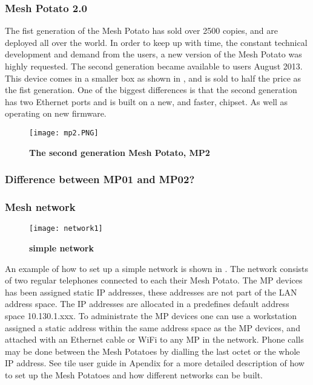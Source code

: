 \subsubsection{Mesh Potato 2.0}
The fist generation of the Mesh Potato has sold over 2500 copies, and are deployed all over the world. In order to keep up with time, the constant technical development and demand from the users, a new version of the Mesh Potato was highly requested. The second generation became available to users August 2013. This device comes in a smaller box as shown in , and is sold to half the price as the fist generation. One of the biggest differences is that the second generation has two Ethernet ports and is built on a new, and faster, chipset. As well as operating on new firmware.

\begin{figure}[h!]
  \centering
      \texttt{[image: mp2.PNG]}
  \caption [MP2]{\textbf{The second generation Mesh Potato, MP2}}
  \label{fig:MP02}
\end{figure}

\subsubsection{Difference between MP01 and MP02?}



\subsubsection{Mesh network}
\begin{figure}[h!]
  \centering
      \texttt{[image: network1]}
  \caption [MP2]{\textbf{simple network}}
  \label{fig:network}
\end{figure}

An example of how to set up a simple network is shown in . The network consists of two regular telephones connected to each their Mesh Potato. The MP devices has been assigned static IP addresses, these addresses are not part of the LAN address space. 
The IP addresses are allocated in a predefines default address space 10.130.1.xxx. To administrate the MP devices one can use a workstation assigned a static address within the same address space as the MP devices, and attached with an Ethernet cable or WiFi to any MP in the network. Phone calls may be done between the Mesh Potatoes by dialling the last octet or the whole IP address. See tile user guide in Apendix for a more detailed description of how to set up the Mesh Potatoes and how different networks can be built. 






